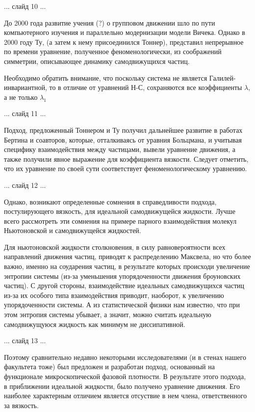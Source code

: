 \documentclass[a4paper,14pt,russian]{extreport}
\begin{document}
  ... слайд 10 ...

  До 2000 года развитие учения (?) о групповом движении шло по пути компьютерного изучения и параллельно модернизации модели Вичека. Однако в 2000 году Ту, (а затем к нему присоединился Тоннер), представил непрерывное по времени уравнение, полученное феноменологически, из соображений симметрии, описывающее динамику самодвижущихся частиц. 

  Необходимо обратить внимание, что поскольку система не является Галилей-инвариантной, то в отличие от уравнений Н-С, сохраняются все коэффициенты $\lambda$, а не только $\lambda_1$

  ... слайд 11 ...

  Подход, предложенный Тоннером и Ту получил дальнейшее развитие в работах Бертина и соавторов, которые, отталкиваясь от уравния Больцмана, и учитывая специфику взаимодействия между частицами, вывели уравнение движения, а также получили явное выражение для коэффициента вязкости. Следует отметить, что их уравнение по своей сути соответствует феноменологическому уравнению.

  ... слайд 12 ...

  Однако, возникают определенные сомнения в справедливости подхода, постулирующего вязкость, для идеальной самодвижущейся жидкости. Лучше всего рассмотреть эти сомнения на примере парного взаимодействия молекул Ньютоновской и самодвижущейся жидкостей.

  Для ньютоновской жидкости столкновения, в силу равновероятности всех направлений движения частиц, приводят к распределению Максвела, но что более важно, именно на соударения частиц, в результате которых происходи увеличение энтропии системы (из-за уменьшения упорядоченности движения броуновских частиц). С другой стороны, взаимодействие идеальных самодвижущихся частиц из-за их особого типа взаимодействия приводит, наоборот, к увеличению упорядоченности системы. А из статистической физики нам известно, что при этом энтропия системы убывает, а значит, можно считать идеальную самодвижущуюся жидкость как минимум не диссипативной.

  ... слайд 13 ...

  Поэтому сравнительно недавно некоторыми исследователями (и в стенах нашего факультета тоже) был предложен и разработан подход, основанный на функционале микроскопической фазовой плотности. В результате этого подхода, в приближении идеальной жидкости, было получено уравнение движения. Его наиболее характерным отличием является отсуствие в нем члена, ответственного за вязкость.
\end{document}

